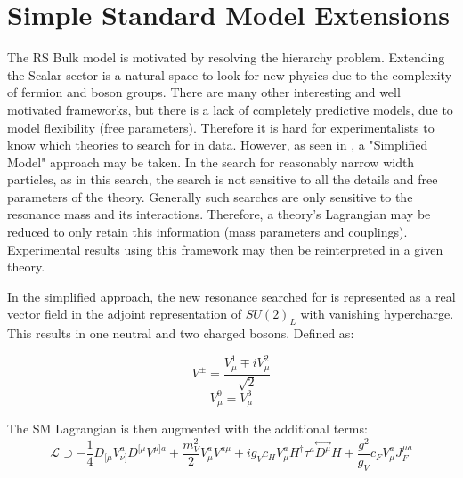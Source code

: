 \section{Simple Standard Model Extensions}
\label{HVT chapter}
The RS Bulk model is motivated by resolving the hierarchy problem. Extending the Scalar sector is a natural space to look for new physics due to the complexity of fermion and boson groups. There are many other interesting and well motivated frameworks, but there is a lack of completely predictive models, due to model flexibility (free parameters). Therefore it is hard for experimentalists to know which theories to search for in data. However, as seen in \cite{hvt}, a "Simplified Model" approach may be taken. In the search for reasonably narrow width particles, as in this search, the search is not sensitive to all the details and free parameters of the theory. Generally such searches are only sensitive to the resonance mass and its interactions. Therefore, a theory's Lagrangian may be reduced to only retain this information (mass parameters and couplings). Experimental results using this framework may then be reinterpreted in a given theory. 

In the simplified approach, the new resonance searched for is represented as a real vector field in the adjoint representation of $SU(2)_{L}$ with vanishing hypercharge. This results in one neutral and two charged bosons. Defined as:

\begin{equation}
V^{\pm}=\frac{V^{1}_{\mu}\mp iV^{2}_{\mu}}{\sqrt{2}}
\end{equation}
\begin{equation}
V^{0}_{\mu}=V^{3}_{\mu}
\end{equation}

The SM Lagrangian is then augmented with the additional terms:
\begin{equation}
\mathcal{L}\supset -\frac{1}{4}D_{[\mu}V^{a}_{\nu]}D^{[\mu}V^{\mu]a} + \frac{m_{V}^{2}}{2}V^{a}_{\mu}V^{a\mu} + ig_{V}c_{H}V^{a}_{\mu}H^{\dag}\tau^{a}\overset\leftrightarrow{D^{\mu}}H+\frac{g^{2}}{g_{V}}c_{F}V^{a}_{\mu}J_{F}^{\mu a}
\end{equation}


